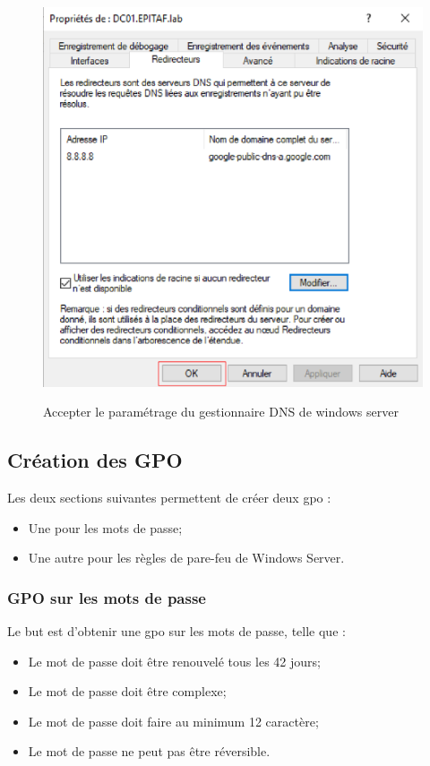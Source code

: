 \begin{figure}[h!]
	\begin{center}
		\caption{Accepter le paramétrage du gestionnaire DNS de windows server}
		\includegraphics[scale=0.8]{WS_Screenshots/52.png}
		\label{Funcs_WinS/24}
	\end{center}
\end{figure}
\FloatBarrier

\subsection{Création des GPO}
Les deux sections suivantes permettent de créer deux gpo :
\begin{itemize}
    \item Une pour les mots de passe;
    \item Une autre pour les règles de pare-feu de Windows Server.
\end{itemize}
\subsubsection{GPO sur les mots de passe}
Le but est d'obtenir une gpo sur les mots de passe, telle que :
\begin{itemize}
    \item Le mot de passe doit être renouvelé tous les 42 jours;
    \item Le mot de passe doit être complexe;
    \item Le mot de passe doit faire au minimum 12 caractère;
    \item Le mot de passe ne peut pas être réversible.
\end{itemize}


